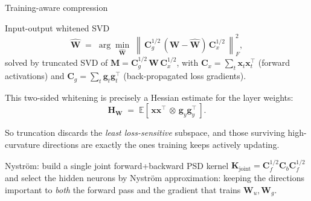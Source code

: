 \documentclass[9pt]{beamer}
\newcommand{\mat}[1]{\mathbf{#1}}
\newcommand{\norm}[1]{\left\lVert#1\right\rVert}
\begin{document}
	\begin{frame}{Training-aware compression}

		Input-output whitened SVD
		\[
		\hat{\mat{W}}
		\;=\;
		\arg\min_{\hat{\mat{W}}}\;
		\norm{\,\mat{C}_g^{1/2}\,(\mat{W}-\hat{\mat{W}})\,\mat{C}_x^{1/2}\,}_F^2 ,
		\]
		solved by truncated SVD of $\mat{M}=\mat{C}_g^{1/2}\,\mat{W}\,\mat{C}_x^{1/2}$,
		with $\mat{C}_x=\sum_t\mat{x}_t\mat{x}_t^{\!\top}$ (forward activations) and
		$\mat{C}_g=\sum_t\mat{g}_t\mat{g}_t^{\!\top}$ (back-propagated loss gradients).
		
		\vspace{0.8em}
		This two-sided whitening is precisely a Hessian estimate for the layer weights:
		\[
		\mat{H}_{\mat{W}} \;=\; \mathbb{E}\!\left[\,\mat{x}\mat{x}^{\!\top}
		\,\otimes\, \mat{g}_y\mat{g}_y^{\!\top}\,\right].
		\]
		
		\vspace{0.4em}
		So truncation discards the \emph{least loss-sensitive} subspace, and those
		surviving high-curvature directions are exactly the ones training keeps
		actively updating.
		
		Nystr\"om: build a single joint forward+backward PSD kernel
		$\mat{K}_{\text{joint}}=\mat{C}_f^{1/2}\mat{C}_b\mat{C}_f^{1/2}$ and select the
		hidden neurons by Nystr\"om approximation: keeping the directions important to
		\emph{both} the forward pass and the gradient that trains $\mat{W}_u,\mat{W}_g$.
		
	\end{frame}
	
\end{document}
